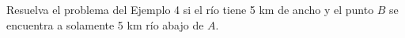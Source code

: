 \item Resuelva el problema del Ejemplo 4 si el río tiene 5 km de ancho y el punto $B$ se encuentra a solamente 5 km río abajo de $A$.
